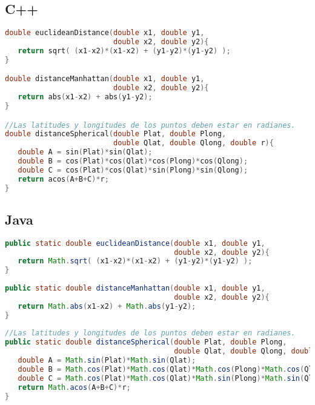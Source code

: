 \subsection{C++}
\begin{lstlisting}[language=C++]
double euclideanDistance(double x1, double y1, 
                         double x2, double y2){
   return sqrt( (x1-x2)*(x1-x2) + (y1-y2)*(y1-y2) );
}

double distanceManhattan(double x1, double y1, 
                         double x2, double y2){
   return abs(x1-x2) + abs(y1-y2);
}

//Las latitudes y longitudes de los puntos deben estar en radianes.
double distanceSpherical(double Plat, double Plong, 
                         double Qlat, double Qlong, double r){
   double A = sin(Plat)*sin(Qlat);
   double B = cos(Plat)*cos(Qlat)*cos(Plong)*cos(Qlong);
   double C = cos(Plat)*cos(Qlat)*sin(Plong)*sin(Qlong);
   return acos(A+B+C)*r;
}
\end{lstlisting} 

\subsection{Java}
\begin{lstlisting}[language=Java]
public static double euclideanDistance(double x1, double y1, 
                                       double x2, double y2){
   return Math.sqrt( (x1-x2)*(x1-x2) + (y1-y2)*(y1-y2) );
}
	
public static double distanceManhattan(double x1, double y1, 
                                       double x2, double y2){
   return Math.abs(x1-x2) + Math.abs(y1-y2);
}
		
//Las latitudes y longitudes de los puntos deben estar en radianes.
public static double distanceSpherical(double Plat, double Plong, 
                                       double Qlat, double Qlong, double r){
   double A = Math.sin(Plat)*Math.sin(Qlat);
   double B = Math.cos(Plat)*Math.cos(Qlat)*Math.cos(Plong)*Math.cos(Qlong);
   double C = Math.cos(Plat)*Math.cos(Qlat)*Math.sin(Plong)*Math.sin(Qlong);
   return Math.acos(A+B+C)*r;
}
\end{lstlisting} 

